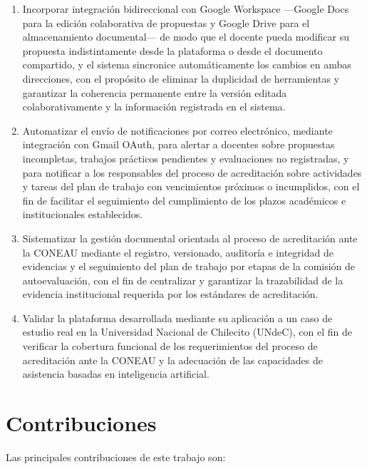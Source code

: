 \begin{enumerate}
    \item Incorporar integraci\'{o}n bidireccional con Google Workspace ---Google Docs para la edici\'{o}n colaborativa de propuestas y Google Drive para el almacenamiento documental--- de modo que el docente pueda modificar su propuesta indistintamente desde la plataforma o desde el documento compartido, y el sistema sincronice autom\'{a}ticamente los cambios en ambas direcciones, con el prop\'{o}sito de eliminar la duplicidad de herramientas y garantizar la coherencia permanente entre la versi\'{o}n editada colaborativamente y la informaci\'{o}n registrada en el sistema.

    \item Automatizar el env\'{i}o de notificaciones por correo electr\'{o}nico, mediante integraci\'{o}n con Gmail OAuth, para alertar a docentes sobre propuestas incompletas, trabajos pr\'{a}cticos pendientes y evaluaciones no registradas, y para notificar a los responsables del proceso de acreditaci\'{o}n sobre actividades y tareas del plan de trabajo con vencimientos pr\'{o}ximos o incumplidos, con el fin de facilitar el seguimiento del cumplimiento de los plazos acad\'{e}micos e institucionales establecidos.

    \item Sistematizar la gesti\'{o}n documental orientada al proceso de acreditaci\'{o}n ante la CONEAU mediante el registro, versionado, auditor\'{i}a e integridad de evidencias y el seguimiento del plan de trabajo por etapas de la comisi\'{o}n de autoevaluaci\'{o}n, con el fin de centralizar y garantizar la trazabilidad de la evidencia institucional requerida por los est\'{a}ndares de acreditaci\'{o}n.

    \item Validar la plataforma desarrollada mediante su aplicaci\'{o}n a un caso de estudio real en la Universidad Nacional de Chilecito (UNdeC), con el fin de verificar la cobertura funcional de los requerimientos del proceso de acreditaci\'{o}n ante la CONEAU y la adecuaci\'{o}n de las capacidades de asistencia basadas en inteligencia artificial.
\end{enumerate}

\section{Contribuciones}
\label{sec:contribuciones}

Las principales contribuciones de este trabajo son:

